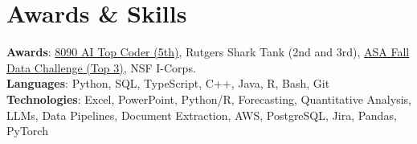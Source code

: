 \documentclass[letterpaper,11pt]{article}
\begin{document}
\section{Awards \& Skills}
 \begin{itemize}[leftmargin=0.15in, label={}]
    \small{\item{
     \textbf{Awards}{: \href{https://github.com/AkeBoss-tech/top-coder-challenge}{8090 AI Top Coder (5th)}, Rutgers Shark Tank (2nd and 3rd), \href{https://acashmoney.biz/portfolio/asa-fall-data/}{ASA Fall Data Challenge (Top 3)}, NSF I-Corps.} \\
     \textbf{Languages}{: Python, SQL, TypeScript, C++, Java, R, Bash, Git} \\
     \textbf{Technologies}{: Excel, PowerPoint, Python/R, Forecasting, Quantitative Analysis, LLMs, Data Pipelines, Document Extraction, AWS, PostgreSQL, Jira, Pandas, PyTorch}
    }}
 \end{itemize}
\end{document}

